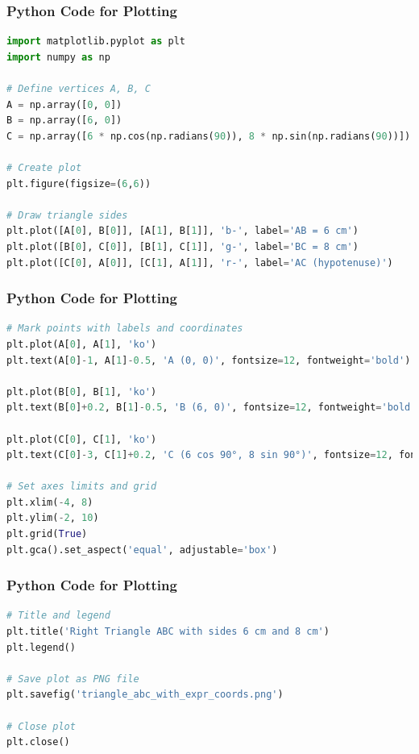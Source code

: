 \documentclass{beamer}
\theoremstyle{remark}
\numberwithin{equation}{section}
\begin{document}
\begin{frame}[fragile]
\frametitle{Python Code for Plotting}
\begin{lstlisting}[language=Python]
import matplotlib.pyplot as plt
import numpy as np

# Define vertices A, B, C
A = np.array([0, 0])
B = np.array([6, 0])
C = np.array([6 * np.cos(np.radians(90)), 8 * np.sin(np.radians(90))])  # (0, 8)

# Create plot
plt.figure(figsize=(6,6))

# Draw triangle sides
plt.plot([A[0], B[0]], [A[1], B[1]], 'b-', label='AB = 6 cm')
plt.plot([B[0], C[0]], [B[1], C[1]], 'g-', label='BC = 8 cm')
plt.plot([C[0], A[0]], [C[1], A[1]], 'r-', label='AC (hypotenuse)')
\end{lstlisting}

\end{frame}
\begin{frame}[fragile]
\frametitle{Python Code for Plotting}
\begin{lstlisting}[language=Python]
# Mark points with labels and coordinates
plt.plot(A[0], A[1], 'ko')
plt.text(A[0]-1, A[1]-0.5, 'A (0, 0)', fontsize=12, fontweight='bold')

plt.plot(B[0], B[1], 'ko')
plt.text(B[0]+0.2, B[1]-0.5, 'B (6, 0)', fontsize=12, fontweight='bold')

plt.plot(C[0], C[1], 'ko')
plt.text(C[0]-3, C[1]+0.2, 'C (6 cos 90°, 8 sin 90°)', fontsize=12, fontweight='bold')

# Set axes limits and grid
plt.xlim(-4, 8)
plt.ylim(-2, 10)
plt.grid(True)
plt.gca().set_aspect('equal', adjustable='box')
\end{lstlisting}

\end{frame}
\begin{frame}[fragile]
\frametitle{Python Code for Plotting}
\begin{lstlisting}[language=Python]
# Title and legend
plt.title('Right Triangle ABC with sides 6 cm and 8 cm')
plt.legend()

# Save plot as PNG file
plt.savefig('triangle_abc_with_expr_coords.png')

# Close plot
plt.close()
\end{lstlisting}

\end{frame}
\end{document}
